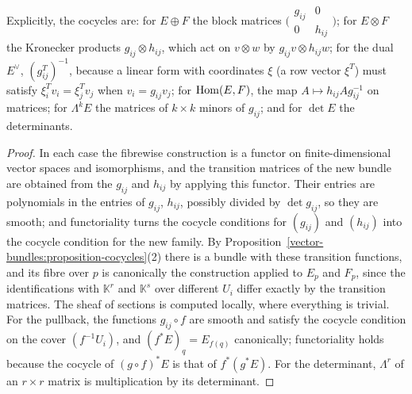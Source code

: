 Explicitly, the cocycles are: for $E \oplus F$ the block matrices $\bigl(\begin{smallmatrix} g_{ij} & 0\\ 0 & h_{ij}\end{smallmatrix}\bigr)$; for $E \otimes F$ the Kronecker products
$g_{ij} \otimes h_{ij}$, which act on $v \otimes w$ by $g_{ij}v \otimes h_{ij}w$; for the dual $E^\vee$, $(g_{ij}^T)^{-1}$, because a linear form with coordinates $\xi$ (a row vector
$\xi^T$) must satisfy $\xi_i^Tv_i = \xi_j^Tv_j$ when $v_i = g_{ij}v_j$; for $\operatorname{Hom}(E, F)$, the map $A \mapsto h_{ij}Ag_{ij}^{-1}$ on matrices; for $\Lambda^kE$ the matrices of $k \times k$
minors of $g_{ij}$; and for $\det E$ the determinants.

\begin{proof}
In each case the fibrewise construction is a functor on finite-dimensional vector spaces and isomorphisms, and the transition matrices of the new bundle are obtained from the
$g_{ij}$ and $h_{ij}$ by applying this functor. Their entries are polynomials in the entries of $g_{ij}$, $h_{ij}$, possibly divided by $\det g_{ij}$, so they are smooth; and functoriality
turns the cocycle conditions for $(g_{ij})$ and $(h_{ij})$ into the cocycle condition for the new family. By Proposition~\ref{vector-bundles:proposition-cocycles}(2) there is a bundle with
these transition functions, and its fibre over $p$ is canonically the construction applied to $E_p$ and $F_p$, since the identifications with $\mathbb{K}^r$ and $\mathbb{K}^s$ over different
$U_i$ differ exactly by the transition matrices. The sheaf of sections is computed locally, where everything is trivial. For the pullback, the functions $g_{ij} \circ f$ are smooth and
satisfy the cocycle condition on the cover $(f^{-1}U_i)$, and $(f^*E)_q = E_{f(q)}$ canonically; functoriality holds because the cocycle of $(g \circ f)^*E$ is that of $f^*(g^*E)$.
For the determinant, $\Lambda^r$ of an $r \times r$ matrix is multiplication by its determinant.
\end{proof}

